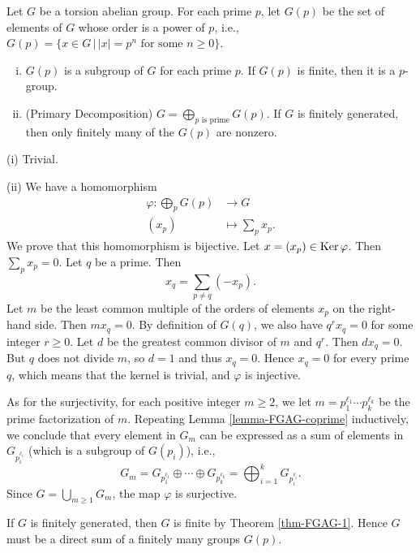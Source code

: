 \begin{theorem} \label{thm-1.3.9}
	Let $G$ be a torsion abelian group. For each prime $p$, let $G(p)$ be the set of elements of $G$ whose order is a power of $p$, i.e., $G(p) = \{x\in G\,|\, |x|=p^n\text{ for some }n\geq 0\}$.
	\begin{enumerate}[(i)]
		\item $G(p)$ is a subgroup of $G$ for each prime $p$. If $G(p)$ is finite, then it is a $p$-group.
		\item (Primary Decomposition) $G =  \bigoplus_{p\text{ is prime}} G(p)$. If $G$ is finitely generated, then only finitely many of the $G(p)$ are nonzero.
	\end{enumerate}
\end{theorem}
\begin{sketch}
	(i) Trivial.
	
	(ii)  We have a homomorphism
	\begin{align*}
		\varphi: \bigoplus_p G(p) &\rightarrow G
		\\
		(x_p) &\mapsto \sum_p x_p.
	\end{align*}
 We prove that this homomorphism is bijective. Let $x = (x_p)\in \operatorname{Ker} \varphi$. Then $\sum_p x_p = 0$. Let $q$ be a prime.  Then
	$$ x_q =  \sum_{p \neq q} (-x_p). $$
	Let $m$ be the least common multiple of the orders of elements $x_p$ on the right-hand side. Then $mx_q = 0$. By definition of $G(q)$, we also have $q^r x_q = 0$ for some integer $r\geq 0$. Let $d$ be the greatest common divisor of $m$ and $q^r$. Then $dx_q = 0$. But $q$ does not divide $m$, so $d=1$ and thus $x_q = 0$. Hence $x_q = 0$ for every prime $q$, which means that the kernel is trivial, and $\varphi$ is injective.
	
	As for the surjectivity, for each positive integer $m\geq 2$, we let $m = p_1^{\ell_1}\cdots p_k^{\ell_k}$ be the prime factorization of $m$.    Repeating Lemma \ref{lemma-FGAG-coprime} inductively, we conclude that every element in $G_m$ can be expressed as a sum of elements in $G_{p_i^{\ell_i}}$ (which is a subgroup of $G(p_i)$), i.e., 
	$$  G_m = G_{p_1^{\ell_1}} \oplus \cdots \oplus G_{p_k^{\ell_k}} =\bigoplus_{i=1}^k G_{p_i^{\ell_i}}. $$
	Since $G = \bigcup_{m\geq 1} G_m$, the map $\varphi$ is surjective.
	
	If $G$ is finitely generated, then $G$ is finite by Theorem \ref{thm-FGAG-1}. Hence $G$ must be a direct sum of a finitely many groups $G(p)$.
\end{sketch}

